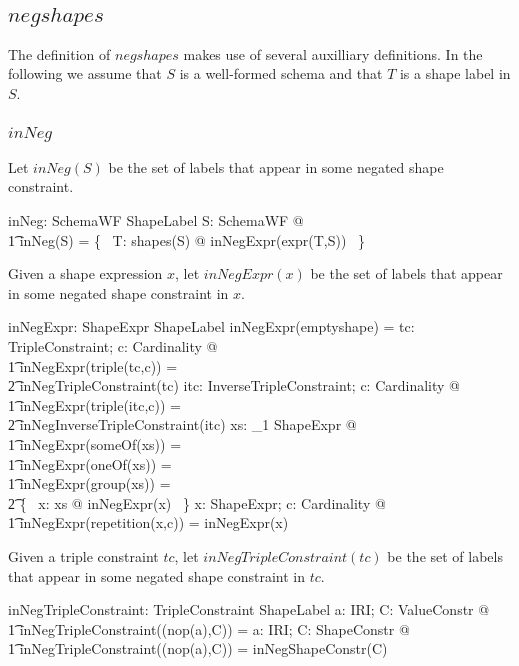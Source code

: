 \documentclass{article}
\begin{document}
\subsection{$negshapes$}
The definition of $negshapes$ makes use of several auxilliary definitions. 
In the following we assume that $S$ is a well-formed schema and that $T$ is a shape label in $S$.

\subsubsection{$inNeg$}
Let $inNeg(S)$ be the set of labels that appear in some negated shape constraint.
\begin{axdef}
	inNeg: SchemaWF \fun \finset ShapeLabel
\where
	\forall S: SchemaWF @ \\
\t1		inNeg(S) = \bigcup \{~ T: shapes(S) @ inNegExpr(expr(T,S)) ~\}
\end{axdef}

Given a shape expression $x$, let $inNegExpr(x)$ be the set of labels that appear in some negated shape constraint in $x$.
\begin{axdef}
	inNegExpr: ShapeExpr \fun \finset ShapeLabel
\where
	inNegExpr(emptyshape) = \emptyset
\also
	\forall tc: TripleConstraint; c: Cardinality @ \\
\t1		inNegExpr(triple(tc,c)) = \\
\t2			inNegTripleConstraint(tc)
\also
	\forall itc: InverseTripleConstraint; c: Cardinality @ \\
\t1		inNegExpr(triple(itc,c)) = \\
\t2			inNegInverseTripleConstraint(itc)
\also
	\forall xs: \seq_1 ShapeExpr @ \\
\t1		inNegExpr(someOf(xs)) = \\
\t1		inNegExpr(oneOf(xs)) = \\
\t1		inNegExpr(group(xs)) = \\
\t2			\bigcup \{~ x: \ran xs @ inNegExpr(x) ~\}
\also
	\forall x: ShapeExpr; c: Cardinality @ \\
\t1		inNegExpr(repetition(x,c)) = inNegExpr(x)
\end{axdef}

Given a triple constraint $tc$, let $inNegTripleConstraint(tc)$ be the set of labels that appear in some negated shape constraint in $tc$.
\begin{axdef}
	inNegTripleConstraint: TripleConstraint \fun \finset ShapeLabel
\where
	\forall a: IRI; C: ValueConstr @ \\
\t1		inNegTripleConstraint((nop(a),C)) = \emptyset
\also
	\forall a: IRI; C: ShapeConstr @ \\
\t1		inNegTripleConstraint((nop(a),C)) = inNegShapeConstr(C)
\end{axdef}
\end{document}
